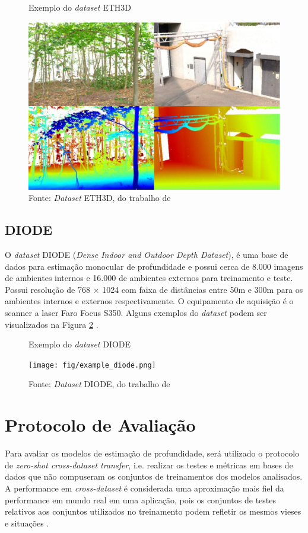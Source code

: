 \begin{figure}[h]
    \centering
    \caption{Exemplo do \textit{dataset} ETH3D}
    \includegraphics[width=.6\textwidth]{fig/eth3d_example.png}
    \caption*{Fonte: \textit{Dataset} ETH3D, do trabalho de }
    \label{fig:eth3dexample}
\end{figure}


\subsection{DIODE}

O \textit{dataset} DIODE (\textit{Dense Indoor and Outdoor Depth Dataset}), é uma base de dados para estimação monocular de profundidade e possui cerca de 8.000 imagens de ambientes internos e 16.000 de ambientes externos para treinamento e teste. Possui resolução de 768 $\times$ 1024 com faixa de distâncias entre 50m e 300m para os ambientes internos e externos respectivamente. O equipamento de aquisição é o scanner a laser Faro Focus S350. Alguns exemplos do \textit{dataset} podem ser visualizados na Figura \ref{exdiode} \cite{diode_dataset}.

\begin{figure}[h]
    \centering
    \caption{Exemplo do \textit{dataset} DIODE}
    \texttt{[image: fig/example\_diode.png]}
    \caption*{Fonte: \textit{Dataset} DIODE, do trabalho de }
    \label{exdiode}
\end{figure}



\section{Protocolo de Avaliação}

Para avaliar os modelos de estimação de profundidade, será utilizado o protocolo de \textit{zero-shot cross-dataset transfer}, i.e. realizar os testes e métricas em bases de dados que não compuseram os conjuntos de treinamentos dos modelos analisados. A performance em \textit{cross-dataset} é considerada uma aproximação mais fiel da performance em mundo real em uma aplicação, pois os conjuntos de testes relativos aos conjuntos utilizados no treinamento podem refletir os mesmos vieses e situações \cite{ranftl2020towards}.

